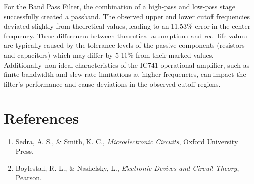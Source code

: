 \documentclass[12pt,a4paper]{article}
\begin{document}
For the Band Pass Filter, the combination of a high-pass and low-pass stage successfully created a passband. The observed upper and lower cutoff frequencies deviated slightly from theoretical values, leading to an 11.53\% error in the center frequency. These differences between theoretical assumptions and real-life values are typically caused by the tolerance levels of the passive components (resistors and capacitors) which may differ by 5-10\% from their marked values. Additionally, non-ideal characteristics of the IC741 operational amplifier, such as finite bandwidth and slew rate limitations at higher frequencies, can impact the filter's performance and cause deviations in the observed cutoff regions.

\section{References}
\begin{enumerate}
    \item Sedra, A. S., \& Smith, K. C., \textit{Microelectronic Circuits}, Oxford University Press.
    \item Boylestad, R. L., \& Nashelsky, L., \textit{Electronic Devices and Circuit Theory}, Pearson.
\end{enumerate}
\end{document}
